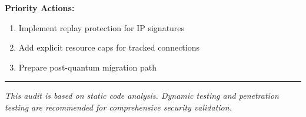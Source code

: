 \documentclass[
]{article}
\providecommand{\tightlist}{%
  \setlength{\itemsep}{0pt}\setlength{\parskip}{0pt}}
\begin{document}
\textbf{Priority Actions:}

\begin{enumerate}
\def\labelenumi{\arabic{enumi}.}
\tightlist
\item
  Implement replay protection for IP signatures
\item
  Add explicit resource caps for tracked connections
\item
  Prepare post-quantum migration path
\end{enumerate}

\begin{center}\rule{0.5\linewidth}{0.5pt}\end{center}

\emph{This audit is based on static code analysis. Dynamic testing and
penetration testing are recommended for comprehensive security
validation.}
\end{document}
